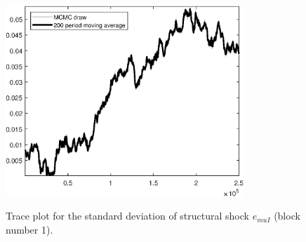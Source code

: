 \begin{figure}[H]
\centering
  \includegraphics[width=0.8\textwidth]{BRS_aggregate/graphs/TracePlot_SE_e_muI_blck_1}\\
    \caption{Trace plot for the standard deviation of structural shock ${e_{muI}}$ (block number 1).}
\end{figure}
